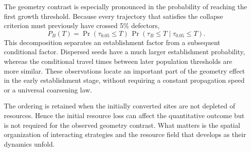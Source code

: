 The geometry contrast is especially pronounced in the probability of reaching the first growth threshold. Because every trajectory that satisfies the collapse criterion must previously have crossed 5\% defectors,
\begin{equation}
\label{eq:reach_decomposition}
P_B(T)=\Pr(\tau_{0.05}\le T)\,
\Pr(\tau_B\le T\mid\tau_{0.05}\le T).
\end{equation}
This decomposition separates an establishment factor from a subsequent conditional factor. Dispersed seeds have a much larger establishment probability, whereas the conditional travel times between later population thresholds are more similar. These observations locate an important part of the geometry effect in the early establishment stage, without requiring a constant propagation speed or a universal coarsening law.

The ordering is retained when the initially converted sites are not depleted of resources. Hence the initial resource loss can affect the quantitative outcome but is not required for the observed geometry contrast. What matters is the spatial organization of interacting strategies and the resource field that develops as their dynamics unfold.
